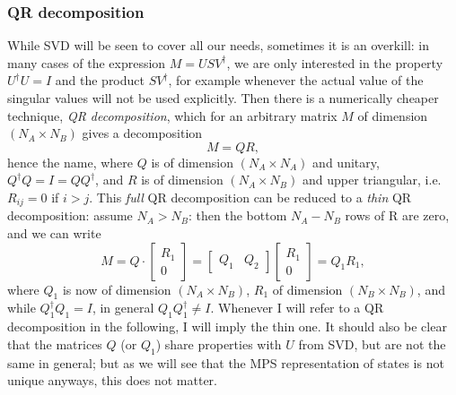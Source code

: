 \subsubsection{QR decomposition}
While SVD will be seen to cover all our needs, sometimes it is an overkill: in many cases of the expression $M=USV^\dagger$, we are only interested in the property $U^\dagger U = I$ and the product $SV^\dagger$, for example whenever the actual value of the singular values will not be used explicitly. Then there is a numerically cheaper technique, {\em QR decomposition}, which for an arbitrary matrix $M$ of dimension $(N_A \times N_B)$ gives a decomposition
\begin{equation}
M = QR ,
\label{eq:QRdecomposition}
\end{equation}
hence the name, where $Q$ is of dimension $(N_A \times N_A)$ and unitary, $Q^\dagger Q = I = Q Q^\dagger$, and $R$ is of dimension $(N_A \times N_B)$ and upper triangular, i.e. $R_{ij}=0$ if $i>j$. This {\em full} QR decomposition can be reduced to a {\em thin} QR decomposition: assume $N_A > N_B$: then the bottom $N_A-N_B$ rows of R are zero, and we can write
\begin{equation}
M=Q \cdot \left[ \begin{array}{c} R_1 \\ 0 \end{array} \right] = \left[ \begin{array}{cc} Q_1 & Q_2 \end{array} \right] \left[ \begin{array}{c} R_1 \\ 0 \end{array} \right] = Q_1 R_1 ,
\label{eq:thinQRdecomposition}
\end{equation}
where $Q_1$ is now of dimension $(N_A \times N_B)$, $R_1$ of dimension $(N_B \times N_B)$, and while $Q_1^\dagger Q_1 = I$, in general $Q_1 Q_1^\dagger \neq I$. Whenever I will refer to a QR decomposition in the following, I will imply the thin one. It should also be clear that the matrices $Q$ (or $Q_1$) share properties with $U$ from SVD, but are not the same in general; but as we will see that the MPS representation of states is not unique anyways, this does not matter.

